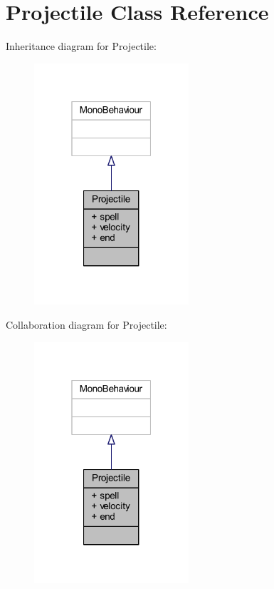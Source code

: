 \hypertarget{class_projectile}{}\section{Projectile Class Reference}
\label{class_projectile}


Inheritance diagram for Projectile\+:\nopagebreak
\begin{figure}[H]
\begin{center}
\leavevmode
\includegraphics[width=163pt]{class_projectile__inherit__graph}
\end{center}
\end{figure}


Collaboration diagram for Projectile\+:\nopagebreak
\begin{figure}[H]
\begin{center}
\leavevmode
\includegraphics[width=163pt]{class_projectile__coll__graph}
\end{center}
\end{figure}
